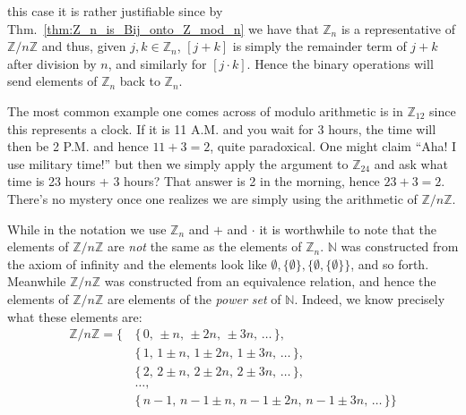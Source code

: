 \documentclass{article}                                                        %
\begin{document}
            this case it is rather justifiable since by
            Thm.~\ref{thm:Z_n_is_Bij_onto_Z_mod_n} we have that $\mathbb{Z}_{n}$ is
            a representative of $\mathbb{Z}/n\mathbb{Z}$ and thus, given
            $j,k\in\mathbb{Z}_{n}$, $[j+k]$ is simply the remainder term of
            $j+k$ after division by $n$, and similarly for $[j\cdot{k}]$. Hence the
            binary operations will send elements of $\mathbb{Z}_{n}$ back to
            $\mathbb{Z}_{n}$.
            \begin{example}
                The most common example one comes across of modulo arithmetic is in
                $\mathbb{Z}_{12}$ since this represents a clock. If it is 11 A.M.
                and you wait for 3 hours, the time will then be 2 P.M. and hence
                $11+3=2$, quite paradoxical. One might claim ``Aha! I use military
                time!'' but then we simply apply the argument to $\mathbb{Z}_{24}$
                and ask what time is 23 hours + 3 hours? That answer is 2 in the
                morning, hence $23+3=2$. There's no mystery once one realizes we are
                simply using the arithmetic of $\mathbb{Z}/n\mathbb{Z}$.
            \end{example}
            While in the notation we use $\mathbb{Z}_{n}$ and $+$ and $\cdot$ it is
            worthwhile to note that the elements of $\mathbb{Z}/n\mathbb{Z}$ are
            \textit{not} the same as the elements of $\mathbb{Z}_{n}$. $\mathbb{N}$
            was constructed from the axiom of infinity and the elements look like
            $\emptyset,\{\emptyset\},\{\emptyset,\{\emptyset\}\}$, and so forth.
            Meanwhile $\mathbb{Z}/n\mathbb{Z}$ was constructed from an equivalence
            relation, and hence the elements of $\mathbb{Z}/n\mathbb{Z}$ are
            elements of the \textit{power set} of $\mathbb{N}$. Indeed, we know
            precisely what these elements are:
            \begin{equation}
                \begin{split}
                    \mathbb{Z}/n\mathbb{Z}=
                    \Big\{\,&\{\,0,\,\pm{n},\,\pm{2n},\,\pm{3n},\,\dots\,\},\\
                            &\{\,1,\,1\pm{n},\,1\pm{2n},\,1\pm{3n},\,\dots\,\},\\
                            &\{\,2,\,2\pm{n},\,2\pm{2n},\,2\pm{3n},\,\dots\,\},\\
                            &\dots,\\
                            &\{\,n-1,\,n-1\pm{n},\,n-1\pm{2n},\,n-1\pm{3n},\,
                                \dots\,\}\Big\}
                \end{split}
            \end{equation}
\end{document}
